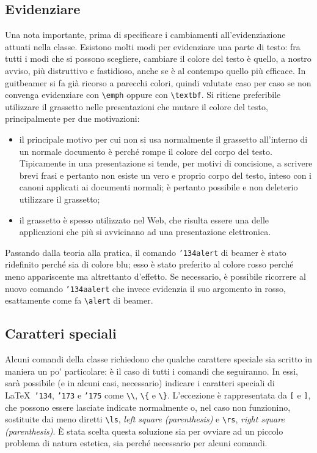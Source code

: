 \documentclass[a4paper,10pt]{article}
\newcommand{\lcap}{{\fontencoding{T1}\selectfont\guillemotleft}}
\newcommand{\rcap}{{\fontencoding{T1}\selectfont\guillemotright}}
\newcommand{\Cap}[1]{\lcap #1\rcap}
\newcommand{\bs}{{\char'134}}%
\newcommand{\lb}{{\char'173}}%
\newcommand{\rb}{{\char'175}}%
\newcommand{\ls}{{\char'133}}%
\newcommand{\rs}{{\char'135}}%
\newcommand{\pkg}[1]{\textsf{#1}}
\let\cls\pkg
\newcommand{\cmd}[1]{\texttt{\bs #1}}
\begin{document}
\subsection{Evidenziare}
Una nota importante, prima di specificare i cambiamenti
all'evidenziazione attuati nella classe. Esistono molti modi per
evidenziare una parte di testo: fra tutti i modi che si possono
scegliere, cambiare il colore del testo è quello, a nostro avviso, più
\Cap{distruttivo} e fastidioso, anche se è al contempo quello più
efficace. In \cls{guitbeamer} si fa già ricorso a parecchi colori,
quindi valutate caso per caso se non convenga evidenziare con
\verb+\emph+ oppure con \verb+\textbf+. Si ritiene preferibile
utilizzare il grassetto nelle presentazioni che mutare il colore del
testo, principalmente per due motivazioni:
\begin{itemize}
  \item il principale motivo per cui non si usa normalmente il
    grassetto all'interno di un normale documento è perché \Cap{rompe
    il colore del corpo del testo}. Tipicamente in una presentazione
    si tende, per motivi di concisione, a scrivere brevi frasi e
    pertanto non esiste un vero e proprio corpo del testo, inteso con
    i canoni applicati ai documenti normali; è pertanto possibile e
    non deleterio utilizzare il grassetto;
  \item il grassetto è spesso utilizzato nel Web, che risulta essere
    una delle applicazioni che più si avvicinano ad una presentazione
    elettronica.
\end{itemize}

Passando dalla teoria alla pratica, il comando \cmd{alert} di
\cls{beamer} è stato ridefinito perché sia di colore blu; esso è stato
preferito al colore rosso perché meno appariscente ma altrettanto
d'effetto. Se necessario, è possibile ricorrere al nuovo comando
\cmd{aalert} che invece evidenzia il suo argomento in rosso,
esattamente come fa \verb+\alert+ di \cls{beamer}.

\subsection{Caratteri speciali}\label{sec:sp_char}
Alcuni comandi della classe richiedono che qualche carattere speciale
sia scritto in maniera un po' particolare: è il caso di
tutti i comandi che seguiranno. In essi, sarà possibile (e in alcuni
casi, necessario) indicare i caratteri speciali di \LaTeX\
\texttt{\bs}, \texttt{\lb} e \texttt{\rb} come \verb+\\+, \verb+\{+ e
\verb+\}+. L'eccezione è rappresentata da \verb+[+ e \verb+]+, che
possono essere lasciate indicate normalmente o, nel caso non
funzionino, sostituite dai meno diretti \verb+\ls+,
\textit{left square (parenthesis)} e \verb+\rs+, \textit{right square
(parenthesis)}. \`E stata scelta questa soluzione sia per ovviare ad un
piccolo problema di natura estetica, sia perché necessario per alcuni
comandi.
\end{document}
